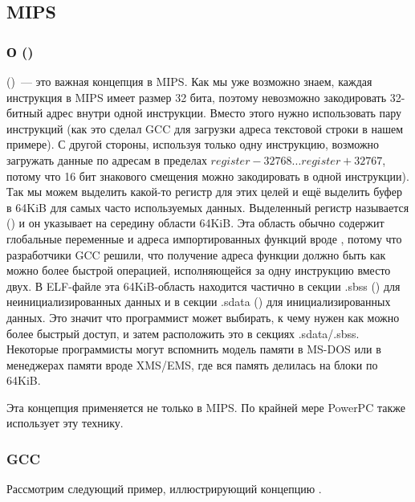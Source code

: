 \subsection{MIPS}

\subsubsection{О  ()}
\label{MIPS_GP}

 ()~--- это важная концепция в MIPS.
Как мы уже возможно знаем, каждая инструкция в MIPS имеет размер 32 бита, поэтому невозможно
закодировать 32-битный адрес внутри одной инструкции. Вместо этого нужно использовать пару инструкций
(как это сделал GCC для загрузки адреса текстовой строки в нашем примере).
С другой стороны, используя только одну инструкцию, 
возможно загружать данные по адресам в пределах $register-32768...register+32767$, потому что 16 бит
знакового смещения можно закодировать в одной инструкции).
Так мы можем выделить какой-то регистр для этих целей и ещё выделить буфер в 64KiB для самых 
часто используемых данных.
Выделенный регистр называется  () и он указывает на середину
области 64KiB.
Эта область обычно содержит глобальные переменные и адреса импортированных функций вроде \printf,
потому что разработчики GCC решили, что получение адреса функции должно быть как можно более быстрой операцией,
исполняющейся за одну инструкцию вместо двух.
В ELF-файле эта 64KiB-область находится частично в секции .sbss () для неинициализированных
данных и в секции .sdata () для инициализированных данных.
Это значит что программист может выбирать, к чему нужен как можно более быстрый доступ, и затем расположить
это в секциях .sdata/.sbss.
Некоторые программисты  могут вспомнить модель памяти в MS-DOS  
или в менеджерах памяти вроде XMS/EMS, где вся память делилась на блоки по 64KiB.

Эта концепция применяется не только в MIPS. По крайней мере PowerPC также использует эту технику.

\subsubsection{\Optimizing GCC}

Рассмотрим следующий пример, иллюстрирующий концепцию .

